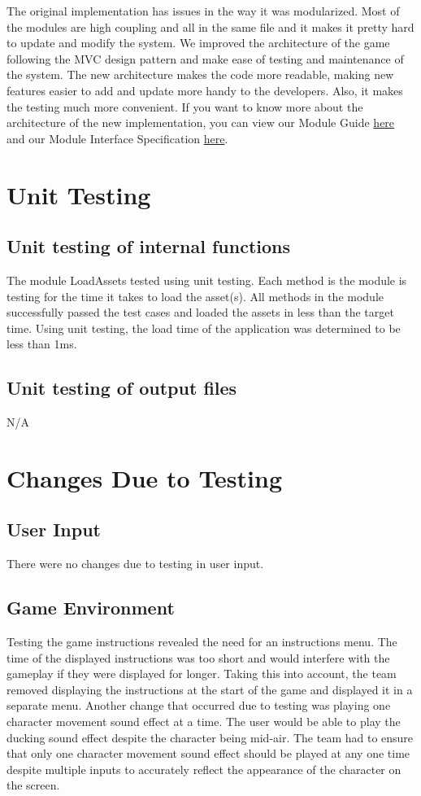 \documentclass[12pt, titlepage]{article}
\begin{document}
The original implementation has issues in the way it was modularized. Most of the modules are high coupling and all in the same file and it makes it pretty hard to update and modify the system. We improved the architecture of the game following the MVC design pattern and make ease of testing and maintenance of the system. The new architecture makes the code more readable, making new features easier to add and update more handy to the developers. Also, it makes the testing much more convenient. If you want to know more about the architecture of the new implementation, you can view our Module Guide \href{https://gitlab.cas.mcmaster.ca/se_3xa3_l3g15/se_3xa3_project/-/blob/master/Doc/Design/MG/MG.pdf}{here} and our Module Interface Specification \href{https://gitlab.cas.mcmaster.ca/se_3xa3_l3g15/se_3xa3_project/-/blob/master/Doc/Design/MIS/MIS.pdf}{here}.

\section{Unit Testing}
\subsection{Unit testing of internal functions}
The module LoadAssets tested using unit testing. Each method is the module is testing for the time it takes to load the asset(s). All methods in the module successfully passed the test cases and loaded the assets in less than the target time. Using unit testing, the load time of the application was determined to be less than 1ms.

\subsection{Unit testing of output files}
N/A

\section{Changes Due to Testing}
\subsection{User Input}
There were no changes due to testing in user input.

\subsection{Game Environment}
Testing the game instructions revealed the need for an instructions menu. The time of the displayed instructions was too short and would interfere with the gameplay if they were displayed for longer. Taking this into account, the team removed displaying the instructions at the start of the game and displayed it in a separate menu. Another change that occurred due to testing was playing one character movement sound effect at a time. The user would be able to play the ducking sound effect despite the character being mid-air. The team had to ensure that only one character movement sound effect should be played at any one time despite multiple inputs to accurately reflect the appearance of the character on the screen.
\end{document}
